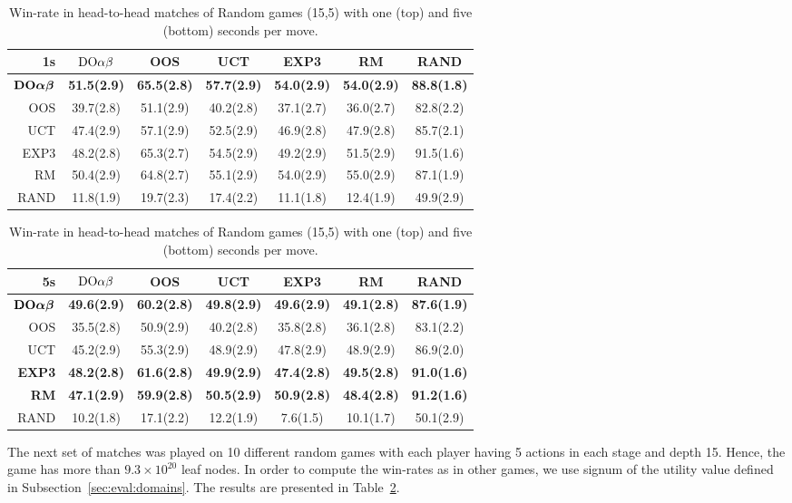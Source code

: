 \begin{table}
\centering
\begin{scriptsize}
\begin{tabular}{|r|cccccc|}\hline
1s&$\textrm{DO}\alpha\beta$&OOS&UCT&EXP3&RM&RAND\\\hline
$\textrm{\bf DO}\boldsymbol{\alpha\beta}$&\textbf{51.5(2.9)}&\textbf{65.5(2.8)}&\textbf{57.7(2.9)}&\textbf{54.0(2.9)}&\textbf{54.0(2.9)}&\textbf{88.8(1.8)}\\
OOS&39.7(2.8)&51.1(2.9)&40.2(2.8)&37.1(2.7)&36.0(2.7)&82.8(2.2)\\
UCT&47.4(2.9)&57.1(2.9)&52.5(2.9)&46.9(2.8)&47.9(2.8)&85.7(2.1)\\
EXP3&48.2(2.8)&65.3(2.7)&54.5(2.9)&49.2(2.9)&51.5(2.9)&91.5(1.6)\\
RM&50.4(2.9)&64.8(2.7)&55.1(2.9)&54.0(2.9)&55.0(2.9)&87.1(1.9)\\
RAND&11.8(1.9)&19.7(2.3)&17.4(2.2)&11.1(1.8)&12.4(1.9)&49.9(2.9)\\
\hline
\end{tabular}
\begin{tabular}{|r|cccccc|}\hline
5s&$\textrm{DO}\alpha\beta$&OOS&UCT&EXP3&RM&RAND\\\hline
$\textrm{\bf DO}\boldsymbol{\alpha\beta}$&\textbf{49.6(2.9)}&\textbf{60.2(2.8)}&\textbf{49.8(2.9)}&\textbf{49.6(2.9)}&\textbf{49.1(2.8)}&\textbf{87.6(1.9)}\\
OOS&35.5(2.8)&50.9(2.9)&40.2(2.8)&35.8(2.8)&36.1(2.8)&83.1(2.2)\\
UCT&45.2(2.9)&55.3(2.9)&48.9(2.9)&47.8(2.9)&48.9(2.9)&86.9(2.0)\\
\textbf{EXP3}&\textbf{48.2(2.8)}&\textbf{61.6(2.8)}&\textbf{49.9(2.9)}&\textbf{47.4(2.8)}&\textbf{49.5(2.8)}&\textbf{91.0(1.6)}\\
\textbf{RM}&\textbf{47.1(2.9)}&\textbf{59.9(2.8)}&\textbf{50.5(2.9)}&\textbf{50.9(2.8)}&\textbf{48.4(2.8)}&\textbf{91.2(1.6)}\\
RAND&10.2(1.8)&17.1(2.2)&12.2(1.9)&7.6(1.5)&10.1(1.7)&50.1(2.9)\\
\hline
\end{tabular}

\end{scriptsize}
\caption{Win-rate in head-to-head matches of Random games (15,5) with one (top) and five (bottom) seconds per move.}\label{fig:matches:rand}
\end{table}


The next set of matches was played on 10 different random games with each player having 5 actions in each stage and depth 15. Hence, the game has more than $9.3\times 10^{20}$ leaf nodes. In order to compute the win-rates as in other games, we use signum of the utility value defined in Subsection~\ref{sec:eval:domains}. The results are presented in Table~\ref{fig:matches:rand}.

